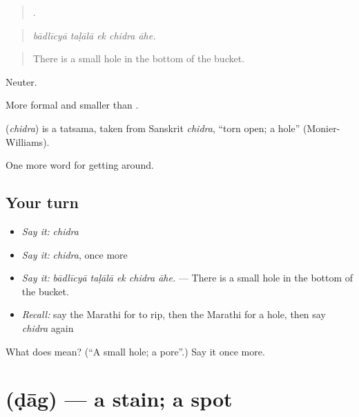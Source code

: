 \begin{quote}
    .
\end{quote}

\begin{quote}
\emph{bādlīcyā taḷālā ek chidra āhe.}
\end{quote}

\begin{quote}
There is a small hole in the bottom of the bucket.
\end{quote}

Neuter.

More formal and smaller than .

\begin{cousinweb}
\textbf{} (\emph{chidra}) is a tatsama, taken from Sanskrit \emph{chidra}, \textquotedblleft{}torn open; a hole\textquotedblright{} (Monier-Williams).
\end{cousinweb}

\begin{grammarlens}[title={What you've built}]
One more word for getting around.
\end{grammarlens}

\subsection*{Your turn}
\begin{itemize}
\raggedright
  \item \emph{Say it:} \emph{chidra}
  \item \emph{Say it:} \emph{chidra}, once more
  \item \emph{Say it:} \emph{bādlīcyā taḷālā ek chidra āhe.} — There is a small hole in the bottom of the bucket.
  \item \emph{Recall:} say the Marathi for to rip, then the Marathi for a hole, then say \emph{chidra} again
\end{itemize}

\begin{tcolorbox}[breakable,colback=teal!4,colframe=teal!35!black,title={Before you move on}]
What does  mean? (\textquotedblleft{}A small hole; a pore\textquotedblright{}.) Say it once more.
\end{tcolorbox}
\section[\texorpdfstring{\mr{डाग} (ḍāg)}{डाग (ḍāg)}]{ (ḍāg) — a stain; a spot}

